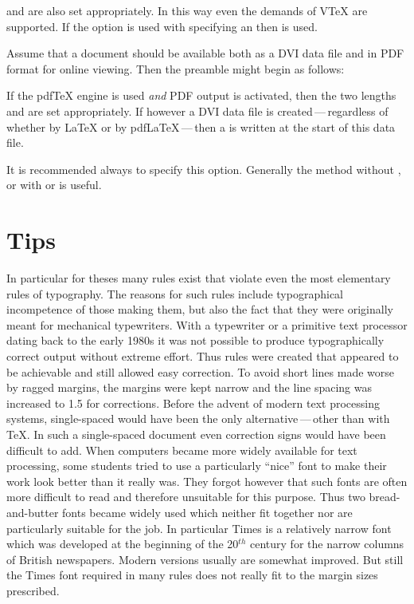 and  are also set appropriately. In this way even
the demands of {V\TeX} are supported. If the option 
is used with specifying an  then  is
used.
\begin{Example}
  Assume that a document should be available both as a DVI data file
  and in PDF format for online viewing. Then the preamble might begin
  as follows:
If the {pdf\TeX} engine is used \emph{and} PDF output is
activated, then the two lengths  and
 are set appropriately.  If however a DVI data
file is created\,---\,regardless of whether by {\LaTeX} or by
{pdf\LaTeX}\,---\,then a  is written at the start of
this data file.
\end{Example}%
It is recommended always to specify this option. Generally the method
without , or with  or
 is useful.%
%
%
%


\section{Tips}
\label{sec:typearea.tips}

In particular for theses many rules exist that violate even the most
elementary rules of typography. The reasons for such rules include
typographical incompetence of those making them, but also the fact
that they were originally meant for mechanical typewriters. With a
typewriter or a primitive text processor dating back to the early
1980s it was not possible to produce typographically correct output
without extreme effort. Thus rules were created that appeared to be
achievable and still allowed easy correction. To avoid short lines
made worse by ragged margins, the margins were kept narrow and the
line spacing was increased to 1.5 for corrections. Before the advent
of modern text processing systems, single-spaced would have been the
only alternative\,---\,other than with \TeX. In such a single-spaced
document even correction signs would have been difficult to add. When
computers became more widely available for text processing, some
students tried to use a particularly ``nice'' font to make their work
look better than it really was. They forgot however that such fonts
are often more difficult to read and therefore unsuitable for this
purpose. Thus two bread-and-butter fonts became widely used which
neither fit together nor are particularly suitable for the job. In
particular Times is a relatively narrow font which was developed at
the beginning of the 20$^{th}$ century for the narrow columns of
British newspapers. Modern versions usually are somewhat improved. But
still the Times font required in many rules does not really fit to the
margin sizes prescribed.

